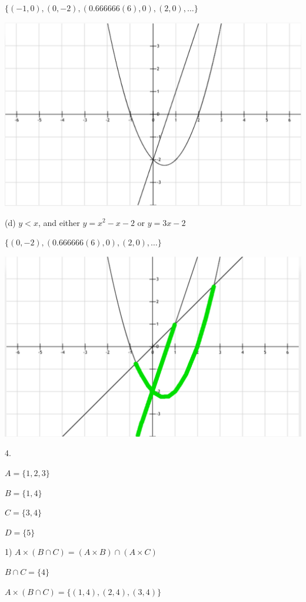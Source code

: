 \documentclass{article}
\newcommand{\vs}{\vspace{30pt}}
\begin{document}
$\{(-1, 0), (0, -2), (0.666666(6),0),(2, 0), \dots\}$

\includegraphics[width=\textwidth,height=\textheight,keepaspectratio]{misc/4_1_3_3}
\vs

(d) $y < x$, and either $y = x^2 - x - 2$ or $y = 3x - 2$

$\{(0, -2), (0.666666(6),0),(2, 0), \dots\}$

\includegraphics[width=\textwidth,height=\textheight,keepaspectratio]{misc/4_1_3_4}
\vs

4.

$A = \{1,2,3\}$

$B = \{1,4\}$

$C = \{3,4\}$

$D = \{5\}$

1) $A \times (B \cap C) = (A \times B) \cap (A \times C)$

$B \cap C = \{4\}$

$A \times (B \cap C) = \{(1,4), (2,4), (3,4)\}$
\end{document}
